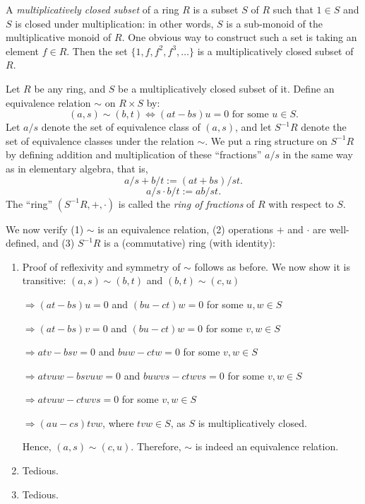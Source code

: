 A \emph{multiplicatively closed subset} of a ring \(R\) is a subset  \(S\) of  \(R\) such that  \(1 \in S\) and  \(S\) is closed under multiplication: in other words,  \(S\) is a sub-monoid of the multiplicative monoid of  \(R\). One obvious way to construct such a set is taking an element \( f \in R \). Then  the set \( \{1, f, f^2, f^3, \ldots\} \) is a multiplicatively closed subset of \( R \).

\begin{definition}
 Let \( R \) be any ring, and \(S\) be a multiplicatively closed subset of it. Define an equivalence relation \(\sim\) on \(R \times S\) by:
\[
    (a, s) \sim (b, t) \iff (at - bs)u = 0 \text{ for some } u \in S.
\] 
Let \(a/s\) denote the set of equivalence class of \((a,s)\), and let \(S^{-1}R\) denote the set of equivalence classes under the relation \(\sim\). We put a ring structure on \(S^{-1}R\) by defining addition and multiplication of these ``fractions'' \(a/s\) in the same way as in elementary algebra, that is,  
\[
a/s + b/t := (at + bs)/st.
\]  
\[
a/s \cdot b/t := ab/st.
\] 
The ``ring'' \((S^{-1}R, +, \cdot)\) is called the \emph{ring of fractions} of \(R\) with respect to \(S\).
\end{definition}
We now verify (1) \(\sim\) is an equivalence relation, (2) operations  \(+\) and  \(\cdot\) are well-defined, and (3)  \(S^{-1}R\) is a (commutative) ring (with identity):
\begin{enumerate}[label=\arabic*)]
    \item Proof of reflexivity and symmetry of \(\sim\) follows as before. We now show it is transitive:
        \((a, s) \sim (b, t)\) and  \((b, t) \sim (c, u)\)

        \(\Longrightarrow (at - bs)u = 0\) and \((bu - ct)w = 0\) for some \(u,w \in S\) 

        \(\Longrightarrow (at - bs)v = 0\) and \((bu - ct)w = 0\) for some \(v,w \in S\) 

\(\Longrightarrow atv - bsv = 0\) and \(buw - ctw = 0\) for some \(v,w \in S\) 

\(\Longrightarrow atvuw - bsvuw = 0\) and \(buwvs - ctwvs = 0\) for some \(v,w \in S\)

\(\Longrightarrow atvuw - ctwvs = 0\) for some \(v, w \in S\)

 \(\Longrightarrow (au - cs) tvw\), where \(tvw \in S\), as  \(S\) is multiplicatively closed.

Hence, \((a, s) \sim (c,u)\). Therefore,  \(\sim\) is indeed an equivalence relation.
    \item Tedious.
    \item Tedious.
\end{enumerate}
